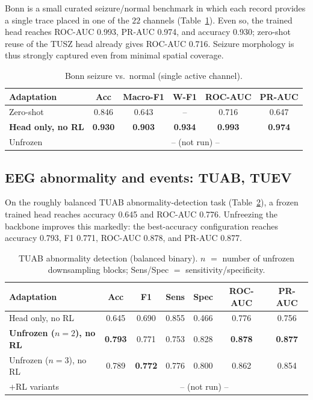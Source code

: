 \documentclass[journal]{IEEEtran}
\newcommand{\best}[1]{\textbf{#1}}
\begin{document}
Bonn is a small curated seizure/normal benchmark in which each record provides a
single trace placed in one of the $22$ channels (Table~\ref{tab:bonn}). Even so,
the trained head reaches ROC-AUC \num{0.993}, PR-AUC \num{0.974}, and accuracy
\num{0.930}; zero-shot reuse of the TUSZ head already gives ROC-AUC \num{0.716}.
Seizure morphology is thus strongly captured even from minimal spatial coverage.

\begin{table}[t]
\centering
\caption{Bonn seizure vs.\ normal (single active channel).}
\label{tab:bonn}
\scriptsize
\setlength{\tabcolsep}{3pt}
\begin{tabular}{@{}lccccc@{}}
\toprule
Adaptation & Acc & Macro-F1 & W-F1 & ROC-AUC & PR-AUC \\
\midrule
Zero-shot              & 0.846 & 0.643 & -- & 0.716 & 0.647 \\
\textbf{Head only, no RL} & \best{0.930} & \best{0.903} & \best{0.934} & \best{0.993} & \best{0.974} \\
Unfrozen               & \multicolumn{5}{c}{-- (not run) --} \\
\bottomrule
\end{tabular}
\end{table}

\subsection{EEG abnormality and events: TUAB, TUEV}
On the roughly balanced TUAB abnormality-detection task
(Table~\ref{tab:tuab}), a frozen trained head reaches accuracy \num{0.645} and
ROC-AUC \num{0.776}. Unfreezing the backbone improves this markedly: the
best-accuracy configuration reaches accuracy \num{0.793}, F1 \num{0.771}, ROC-AUC
\num{0.878}, and PR-AUC \num{0.877}.

\begin{table}[t]
\centering
\caption{TUAB abnormality detection (balanced binary). $n$ $=$ number of
unfrozen downsampling blocks; Sens/Spec $=$ sensitivity/specificity.}
\label{tab:tuab}
\scriptsize
\setlength{\tabcolsep}{3pt}
\begin{tabular}{@{}lcccccc@{}}
\toprule
Adaptation & Acc & F1 & Sens & Spec & ROC-AUC & PR-AUC \\
\midrule
Head only, no RL         & 0.645 & 0.690 & 0.855 & 0.466 & 0.776 & 0.756 \\
\textbf{Unfrozen ($n{=}2$), no RL} & \best{0.793} & 0.771 & 0.753 & 0.828 & \best{0.878} & \best{0.877} \\
Unfrozen ($n{=}3$), no RL & 0.789 & \best{0.772} & 0.776 & 0.800 & 0.862 & 0.854 \\
$+$RL variants           & \multicolumn{6}{c}{-- (not run) --} \\
\bottomrule
\end{tabular}
\end{table}
\end{document}
